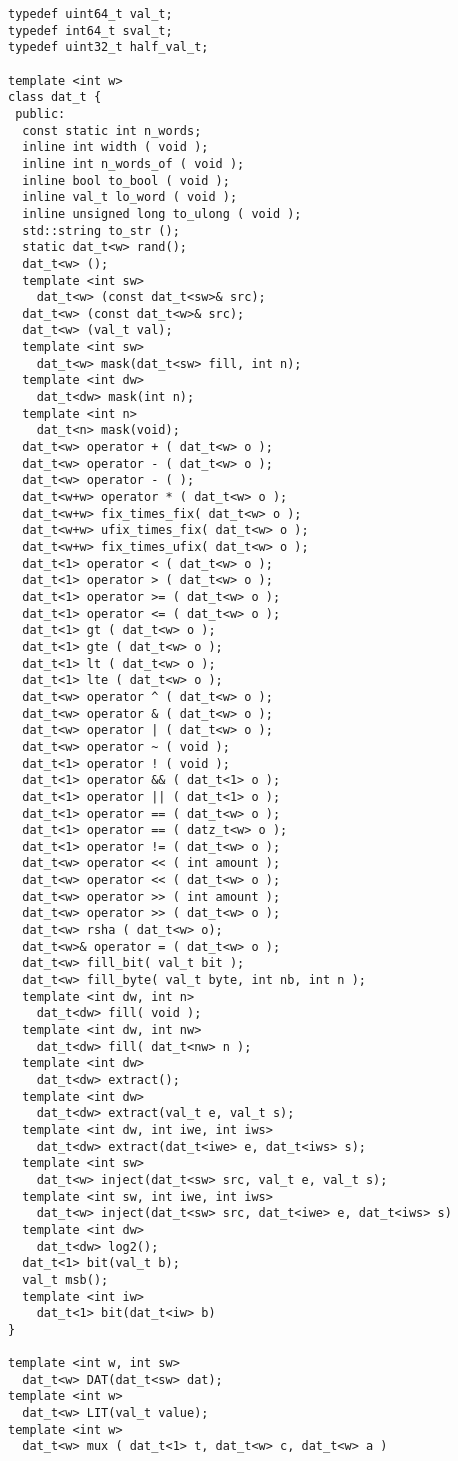 \documentclass[10pt,twocolumn]{article}
\begin{document}
\begin{verbatim}
typedef uint64_t val_t;
typedef int64_t sval_t; 
typedef uint32_t half_val_t;

template <int w>
class dat_t {
 public:
  const static int n_words;
  inline int width ( void );
  inline int n_words_of ( void );
  inline bool to_bool ( void );
  inline val_t lo_word ( void );
  inline unsigned long to_ulong ( void );
  std::string to_str ();
  static dat_t<w> rand();
  dat_t<w> ();
  template <int sw> 
    dat_t<w> (const dat_t<sw>& src);
  dat_t<w> (const dat_t<w>& src);
  dat_t<w> (val_t val);
  template <int sw> 
    dat_t<w> mask(dat_t<sw> fill, int n);
  template <int dw> 
    dat_t<dw> mask(int n);
  template <int n> 
    dat_t<n> mask(void);
  dat_t<w> operator + ( dat_t<w> o );
  dat_t<w> operator - ( dat_t<w> o );
  dat_t<w> operator - ( );
  dat_t<w+w> operator * ( dat_t<w> o );
  dat_t<w+w> fix_times_fix( dat_t<w> o );
  dat_t<w+w> ufix_times_fix( dat_t<w> o );
  dat_t<w+w> fix_times_ufix( dat_t<w> o );
  dat_t<1> operator < ( dat_t<w> o );
  dat_t<1> operator > ( dat_t<w> o );
  dat_t<1> operator >= ( dat_t<w> o );
  dat_t<1> operator <= ( dat_t<w> o );
  dat_t<1> gt ( dat_t<w> o );
  dat_t<1> gte ( dat_t<w> o );
  dat_t<1> lt ( dat_t<w> o );
  dat_t<1> lte ( dat_t<w> o );
  dat_t<w> operator ^ ( dat_t<w> o );
  dat_t<w> operator & ( dat_t<w> o );
  dat_t<w> operator | ( dat_t<w> o );
  dat_t<w> operator ~ ( void );
  dat_t<1> operator ! ( void );
  dat_t<1> operator && ( dat_t<1> o );
  dat_t<1> operator || ( dat_t<1> o );
  dat_t<1> operator == ( dat_t<w> o );
  dat_t<1> operator == ( datz_t<w> o );
  dat_t<1> operator != ( dat_t<w> o );
  dat_t<w> operator << ( int amount );
  dat_t<w> operator << ( dat_t<w> o );
  dat_t<w> operator >> ( int amount );
  dat_t<w> operator >> ( dat_t<w> o );
  dat_t<w> rsha ( dat_t<w> o);
  dat_t<w>& operator = ( dat_t<w> o );
  dat_t<w> fill_bit( val_t bit );
  dat_t<w> fill_byte( val_t byte, int nb, int n );
  template <int dw, int n> 
    dat_t<dw> fill( void );
  template <int dw, int nw> 
    dat_t<dw> fill( dat_t<nw> n );
  template <int dw> 
    dat_t<dw> extract();
  template <int dw> 
    dat_t<dw> extract(val_t e, val_t s);
  template <int dw, int iwe, int iws> 
    dat_t<dw> extract(dat_t<iwe> e, dat_t<iws> s);
  template <int sw> 
    dat_t<w> inject(dat_t<sw> src, val_t e, val_t s);
  template <int sw, int iwe, int iws>
    dat_t<w> inject(dat_t<sw> src, dat_t<iwe> e, dat_t<iws> s)
  template <int dw> 
    dat_t<dw> log2();
  dat_t<1> bit(val_t b);
  val_t msb();
  template <int iw>
    dat_t<1> bit(dat_t<iw> b)
}

template <int w, int sw> 
  dat_t<w> DAT(dat_t<sw> dat);
template <int w> 
  dat_t<w> LIT(val_t value);
template <int w>
  dat_t<w> mux ( dat_t<1> t, dat_t<w> c, dat_t<w> a )
\end{verbatim}
\end{document}
